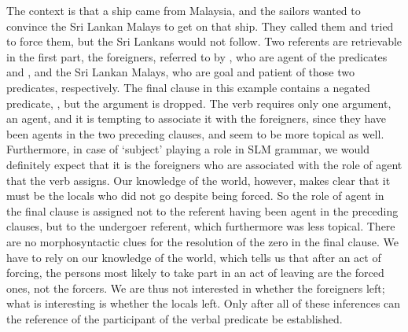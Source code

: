 
The context is that a ship came from Malaysia, and the sailors wanted to convince the Sri Lankan Malays to get on that ship. They called them and tried to force them, but the Sri Lankans would not follow. Two referents are retrievable in the first part, the foreigners, referred to by , who are agent of the predicates  and , and the Sri Lankan Malays, who are goal and patient of those two predicates, respectively. The final clause in this example contains a negated predicate, , but the argument is dropped. The verb  requires only one argument, an agent, and it is tempting to associate it with the foreigners, since they have been agents in the two preceding clauses, and seem to be more topical as well. Furthermore, in case of `subject' playing a role in SLM grammar, we would definitely expect that it is the foreigners who are associated with the role of agent that the verb  assigns. Our knowledge of the world, however, makes clear that it must be the locals who did not go despite being forced. So the role of agent in the final clause is assigned not to the referent having been agent in the preceding clauses, but to the undergoer referent, which furthermore was less topical. There are no morphosyntactic clues for the resolution of the zero in the final clause. We have to rely on our knowledge of the world, which tells us that after an act of forcing, the persons most likely to take part in an  act of leaving are the forced ones, not the forcers. We are thus not interested in whether the foreigners left; what is interesting is whether the locals left. Only after all of  these inferences can the reference of the participant of the verbal predicate  be established.


